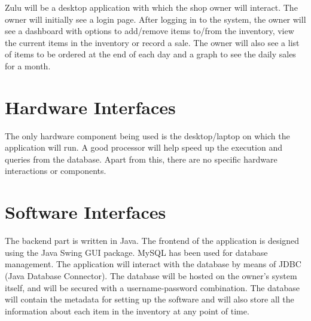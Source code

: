 \documentclass{scrreprt}
\begin{document}
Zulu will be a desktop application with which the shop owner will interact. The owner will initially see a login page. After logging in to the system, the owner will see a dashboard with options to add/remove items to/from the inventory, view the current items in the inventory or record a sale. The owner will also see a list of items to be ordered at the end of each day and a graph to see the daily sales for a month.

\section{Hardware Interfaces}

The only hardware component being used is the desktop/laptop on which the application will run. A good processor will help speed up the execution and queries from the database. Apart from this, there are no specific hardware interactions or components.

\section{Software Interfaces}

The backend part is written in Java. The frontend of the application is designed using the Java Swing GUI package. MySQL has been used for database management. The application will interact with the database by means of JDBC (Java Database Connector). The database will be hosted on the owner's system itself, and will be secured with a username-password combination. The database will contain the metadata for setting up the software and will also store all the information about each item in the inventory at any point of time.
\end{document}
